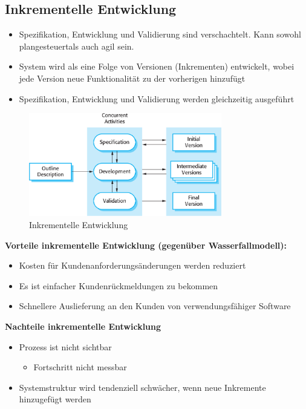 \subsection{Inkrementelle Entwicklung}
\begin{itemize}
    \item Spezifikation, Entwicklung und Validierung sind verschachtelt. Kann sowohl plangesteuertals auch agil sein.
    \item System wird als eine Folge von Versionen (Inkrementen) entwickelt, wobei jede Version neue Funktionalität zu der vorherigen hinzufügt
    \item Spezifikation, Entwicklung und Validierung werden gleichzeitig ausgeführt
\end{itemize}
\begin{figure}[h] 
  \centering
     \includegraphics[width=0.75\textwidth]{mainmatter/pics/inkrement_evolution.png}
  \caption{Inkrementelle Entwicklung}
\end{figure}
\textbf{Vorteile inkrementelle Entwicklung (gegenüber Wasserfallmodell):}
\begin{itemize}
    \item Kosten für Kundenanforderungsänderungen werden reduziert
    \item Es ist einfacher Kundenrückmeldungen zu bekommen 
    \item Schnellere Auslieferung an den Kunden von verwendungsfähiger Software 
\end{itemize}

\textbf{Nachteile inkrementelle Entwicklung}
\begin{itemize}
    \item Prozess ist nicht sichtbar
    \begin{itemize}
        \item Fortschritt nicht messbar
    \end{itemize}
    \item Systemstruktur wird tendenziell schwächer, wenn neue Inkremente hinzugefügt werden
\end{itemize}
